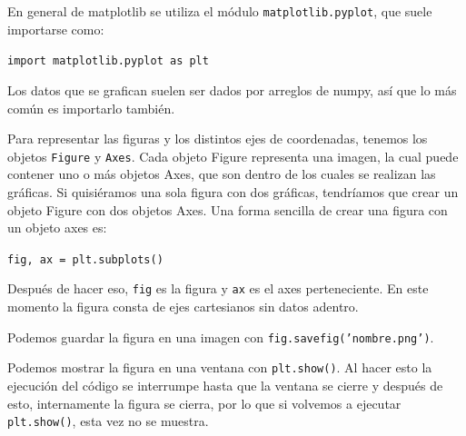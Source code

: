 \documentclass[a4paper, 12pt]{report}
\theoremstyle{definition}
\begin{document}
En general de matplotlib se utiliza el módulo {\tt matplotlib.pyplot}, que suele importarse como:

\centerline{\tt import matplotlib.pyplot as plt}

\vspace{1em}
Los datos que se grafican suelen ser dados por arreglos de numpy, así que lo más común es importarlo también.

Para representar las figuras y los distintos ejes de coordenadas, tenemos los objetos {\tt Figure} y {\tt Axes}. Cada objeto Figure representa una imagen, la cual puede contener uno o más objetos Axes, que son dentro de los cuales se realizan las gráficas. Si quisiéramos una sola figura con dos gráficas, tendríamos que crear un objeto Figure con dos objetos Axes. Una forma sencilla de crear una figura con un objeto axes es:

\vspace{.8em}
\centerline{\tt fig, ax = plt.subplots()}

\vspace{1em}
Después de hacer eso, {\tt fig} es la figura y {\tt ax} es el axes perteneciente. En este momento la figura consta de ejes cartesianos sin datos adentro.

Podemos guardar la figura en una imagen con {\tt fig.savefig('nombre.png')}.

Podemos mostrar la figura en una ventana con {\tt plt.show()}. Al hacer esto la ejecución del código se interrumpe hasta que la ventana se cierre y después de esto, internamente la figura se cierra, por lo que si volvemos a ejecutar {\tt plt.show()}, esta vez no se muestra.
\end{document}
